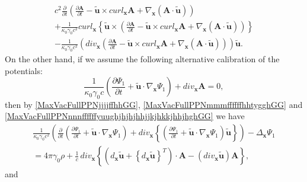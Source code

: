 \documentclass{article}
\theoremstyle{definition}
\theoremstyle{remark}
\renewcommand{\vec}[1]{\mathbf{#1}}
\newcommand{\er}{\eqref}
\newcommand{\er}{\eqref}
\begin{document}
\begin{multline}
{c^2}\frac{\partial}{\partial t}\left(\frac{\partial\vec A}{\partial
t}-\vec {\tilde u}\times curl_{\vec x}\vec A+\nabla_{\vec
x}\left(\vec A\cdot\vec {\tilde
u}\right)\right)\\+\frac{1}{\kappa_0\gamma_0 c^2}curl_{\vec x}
\left\{\vec {\tilde u}\times
\left(\frac{\partial\vec A}{\partial t}-\vec {\tilde u}\times
curl_{\vec x}\vec A+\nabla_{\vec x}\left(\vec A\cdot\vec {\tilde
u}\right)\right)\right\}\\-\frac{1}{\kappa_0\gamma_0
c^2}\left(div_{\vec x}\left(\frac{\partial\vec A}{\partial t}-\vec
{\tilde u}\times curl_{\vec x}\vec A+\nabla_{\vec x}\left(\vec
A\cdot\vec {\tilde u}\right)\right)\right)\vec {\tilde u}.
\end{multline}
On the other hand, if we assume the following alternative
calibration of the potentials:
\begin{equation}\label{MaxVacFullPPNjjjjffhhGG}
\frac{1}{\kappa_0\gamma_0 c}\left(\frac{\partial\Psi_1}{\partial
t}+\vec {\tilde u}\cdot\nabla_{\vec x}\Psi_1\right)+div_{\vec x}\vec
A=0,
\end{equation}
then by \er{MaxVacFullPPNjjjjffhhGG},
\er{MaxVacFullPPNmmmffffffhhtygghGG} and
\er{MaxVacFullPPNnnnffffffyuughjhjhjhhjjkjhkkjhhjhghGG} we have
\begin{multline}\label{MaxVacFullPPNmmmffffffiuiuhjuGG}
\frac{1}{\kappa_0\gamma_0 c^2}\left(\frac{\partial}{\partial
t}\left(\frac{\partial\Psi_1}{\partial t}+\vec {\tilde
u}\cdot\nabla_{\vec x}\Psi_1\right)+div_{\vec x}
\left\{\left(\frac{\partial\Psi_1}{\partial t}+\vec {\tilde
u}\cdot\nabla_{\vec x}\Psi_1\right)\vec {\tilde
u}\right\}\right)-\Delta_{\vec
x}\Psi_1\\=4\pi\gamma_0\rho+\frac{1}{c}\,div_{\vec x}
\left\{\left(d_{\vec x}\vec {\tilde u}+\left\{d_{\vec x}\vec {\tilde
u}\right\}^T\right)\cdot\vec A-\left(div_{\vec x}\vec {\tilde
u}\right)\vec A\right\},
\end{multline}
and
\end{document}
